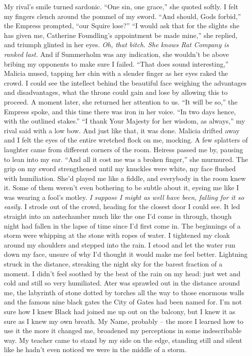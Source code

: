 \documentclass[12pt, openany]{book}
\begin{document}
My rival’s smile turned sardonic.
“One sin, one grace,” she quoted softly.
I felt my fingers clench around the pommel of my sword.
“And should, Gods forbid,” the Empress prompted, “our Squire lose?”
“I would ask that for the slights she has given me, Catherine Foundling’s appointment be made mine,” she replied, and triumph glinted in her eyes.
\textit{Oh, that bitch. She knows Rat Company is ranked last.} And if Summerholm was any indication, she wouldn’t be above bribing my opponents to make sure I failed.
“That does sound interesting,” Malicia mused, tapping her chin with a slender finger as her eyes raked the crowd.
I could see the intellect behind the beautiful face weighing the advantages and disadvantages, what the throne could gain and lose by allowing this to proceed. A moment later, she returned her attention to us.
“It will be so,” the Empress spoke, and this time there was iron in her voice. “In two days hence, with the outlined stakes.”
“I thank Your Majesty for her wisdom, as always,” my rival said with a low bow.
And just like that, it was done. Malicia drifted away and I felt the eyes of the entire wretched flock on me, mocking. A few splatters of laughter came from different corners of the room. Heiress passed me by, pausing to lean into my ear.
“And all it cost me was a broken finger,” she murmured.
The grip on my sword strengthened until my knuckles were white, my face flushed with humiliation. She’d played me like a fiddle, and everybody in the room knew it. Some of them weren’t even bothering to be subtle about it, eyeing me like I was wearing a fool’s motley. \textit{I suppose I might as well have been, falling for it so easily.} I strode out of the crowd, heading for the closest door I could see. It led straight into an antechamber much like the one I’d come in through, though night had fallen in the lapse of time since I’d first come in. The beginnings of a storm were whipping at the stone with ropes of water. I tightened my cloak around my shoulders and stepped into the rain.
I stood and let the water run down my face, unsure of why I’d thought it would make me feel better. Lightning struck in the distance, streaking the night sky for the barest fraction of a moment. I didn’t feel soothed by the beat of the rain on my head: just wet and cold and still so very humiliated. Ater was sprawled out in the distance around me, the labyrinth of stone dotted by torches all the way to those enormous walls and the famous nine black gates the City of Gates had been named for. I’m not sure how I knew Black had joined me up out on the balcony, but I knew it as sure as I knew my own breath. My Name, probably – the more I learned how to use it the more it changed me, broadened my perceptions in some indescribable way. My teacher came to stand by my side on the edge, standing still and silent like he hadn’t even noticed we were in the middle of a storm.
\end{document}
